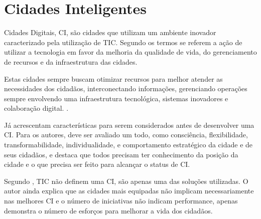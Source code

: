 \section{Cidades Inteligentes}

Cidades Digitais, CI, são cidades que utilizam um ambiente inovador caracterizado pela utilização de TIC. Segundo  os termos se referem a ação de utilizar a tecnologia em favor da melhoria da qualidade de vida, do gerenciamento de recursos e da infraestrutura das cidades.

Estas cidades sempre buscam otimizar recursos para melhor atender as necessidades dos cidadãos, interconectando informações, gerenciando operações sempre envolvendo uma infraestrutura tecnológica, sistemas inovadores e colaboração digital. \cite{washburn2010helping}.


Já  acrescentam características para serem considerados antes de desenvolver uma CI. Para os autores, deve ser avaliado um todo, como consciência, flexibilidade, transformabilidade, individualidade, e comportamento estratégico da cidade e de seus cidadãos, e destaca que todos precisam ter conhecimento da posição da cidade e o que precisa ser feito para alcançar o status de CI. 

Segundo , TIC não definem uma CI, são apenas uma das soluções utilizadas. O autor ainda explica que as cidades mais equipadas não implicam necessariamente nas melhores CI e o número de iniciativas não indicam performance, apenas demonstra o número de esforços para melhorar a vida dos cidadãos. 

